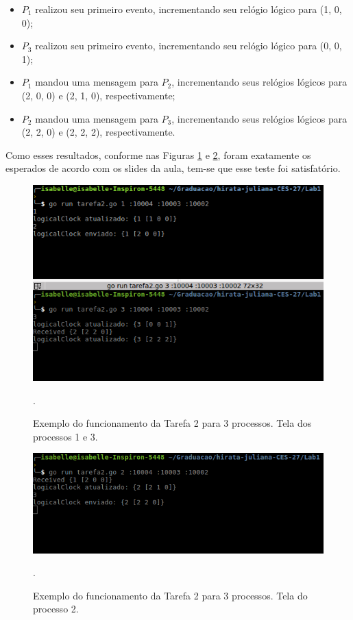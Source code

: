 \documentclass[conference]{IEEEtran}
\begin{document}
\begin{itemize}
\item $P_1$ realizou seu primeiro evento, incrementando seu relógio lógico para (1, 0, 0);
\item $P_3$ realizou seu primeiro evento, incrementando seu relógio lógico para (0, 0, 1);
\item $P_1$ mandou uma mensagem para $P_2$, incrementando seus relógios lógicos para (2, 0, 0) e (2, 1, 0), respectivamente;
\item $P_2$ mandou uma mensagem para $P_3$, incrementando seus relógios lógicos para (2, 2, 0) e (2, 2, 2), respectivamente.
\end{itemize}

	Como esses resultados, conforme nas Figuras \ref{tarefa2-testeslide-1} e \ref{tarefa2-testeslide-2}, foram exatamente os esperados de acordo com os slides da aula, tem-se que esse teste foi satisfatório.

\begin{figure}[H]
\centering
\centerline{\includegraphics[scale=0.4]{imagens/tarefa2-testeslide-1.png}}
\caption{Exemplo do funcionamento da Tarefa 2 para 3 processos. Tela dos processos 1 e 3.}.
\label{tarefa2-testeslide-1}
\end{figure}

\begin{figure}[H]
\centering
\centerline{\includegraphics[scale=0.4]{imagens/tarefa2-testeslide-2.png}}
\caption{Exemplo do funcionamento da Tarefa 2 para 3 processos. Tela do processo 2.}.
\label{tarefa2-testeslide-2}
\end{figure}
\end{document}
